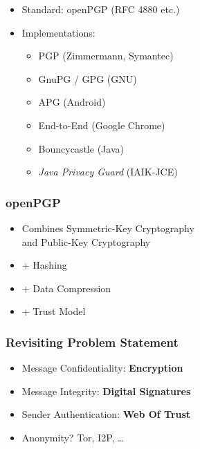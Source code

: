 \documentclass{beamer}
\begin{document}


\begin{frame}

	\begin{itemize}
		\item Standard: openPGP (RFC 4880 etc.)
		\item Implementations:
		\begin{itemize}
			\item PGP (Zimmermann, Symantec)
			\item GnuPG / GPG (GNU)
			\item APG (Android)
			\item End-to-End (Google Chrome)
			\item Bouncycastle (Java)
			\item \textit{Java Privacy Guard} (IAIK-JCE)
		\end{itemize}
	\end{itemize}

\end{frame}


\begin{frame}
	\frametitle{openPGP}
	
	\begin{itemize}
		\item Combines Symmetric-Key Cryptography \\and Public-Key Cryptography
		\item + Hashing
		\item + Data Compression
		\item + Trust Model 
	\end{itemize}
	
\end{frame}


\begin{frame}
	\frametitle{Revisiting Problem Statement}

	\begin{itemize}
		\item Message Confidentiality: \textbf{Encryption} 
		\item Message Integrity:          \textbf{Digital Signatures} 
		\item Sender Authentication:    	\textbf{Web Of Trust}
		\item Anonymity? Tor, I2P, \ldots
	\end{itemize}


\end{frame}
\end{document}
